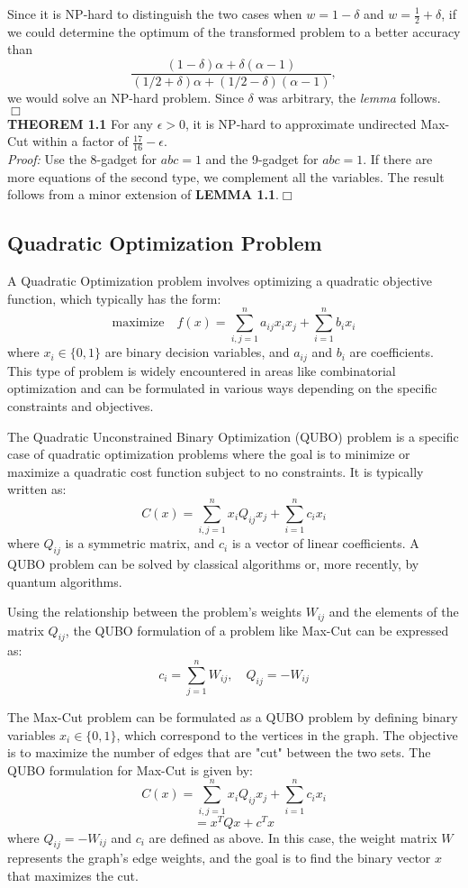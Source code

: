 \documentclass[12pt]{article}
\begin{document}
Since it is NP-hard to distinguish the two cases when \( w = 1 - \delta \) and \( w = \frac{1}{2} + \delta \), if we could determine the optimum of the transformed problem to a better accuracy than
\[
\frac{(1 - \delta)\alpha + \delta(\alpha - 1)}{(1/2 + \delta)\alpha + (1/2 - \delta)(\alpha - 1)},
\]
we would solve an NP-hard problem. Since \( \delta \) was arbitrary, the \textit{lemma} follows. \hfill \(\Box\)
 \\
\textbf{THEOREM 1.1} For any \( \epsilon > 0 \), it is NP-hard to approximate undirected Max-Cut within a factor of \( \frac{17}{16} - \epsilon \).\\
\textit{Proof:} Use the 8-gadget for \( abc = 1 \) and the 9-gadget for \( abc = 1 \). If there are more equations of the second type, we complement all the variables. The result follows from a minor extension of \textbf{LEMMA 1.1}.\hfill \(\Box\)


\subsection{Quadratic Optimization Problem}
A Quadratic Optimization problem involves optimizing a quadratic objective function, which typically has the form:
\[
\text{maximize} \quad f(x) = \sum_{i,j=1}^{n} a_{ij} x_i x_j + \sum_{i=1}^{n} b_i x_i
\]
where \( x_i \in \{0, 1\} \) are binary decision variables, and \( a_{ij} \) and \( b_i \) are coefficients. This type of problem is widely encountered in areas like combinatorial optimization and can be formulated in various ways depending on the specific constraints and objectives.

The Quadratic Unconstrained Binary Optimization (QUBO) problem is a specific case of quadratic optimization problems where the goal is to minimize or maximize a quadratic cost function subject to no constraints. It is typically written as:
\[
C(x) = \sum_{i,j=1}^{n} x_i Q_{ij} x_j + \sum_{i=1}^{n} c_i x_i
\]
where \( Q_{ij} \) is a symmetric matrix, and \( c_i \) is a vector of linear coefficients. A QUBO problem can be solved by classical algorithms or, more recently, by quantum algorithms.

Using the relationship between the problem's weights \( W_{ij} \) and the elements of the matrix \( Q_{ij} \), the QUBO formulation of a problem like Max-Cut can be expressed as:
\[
c_i = \sum_{j=1}^{n} W_{ij}, \quad Q_{ij} = -W_{ij}
\]

The Max-Cut problem can be formulated as a QUBO problem by defining binary variables \( x_i \in \{0, 1\} \), which correspond to the vertices in the graph. The objective is to maximize the number of edges that are "cut" between the two sets. The QUBO formulation for Max-Cut is given by:
\[
C(x) = \sum_{i,j=1}^{n} x_i Q_{ij} x_j + \sum_{i=1}^{n} c_i x_i
\]
\[
= x^T Q x + c^T x
\]
where \( Q_{ij} = -W_{ij} \) and \( c_i \) are defined as above. In this case, the weight matrix \( W \) represents the graph’s edge weights, and the goal is to find the binary vector \( x \) that maximizes the cut.
\end{document}

